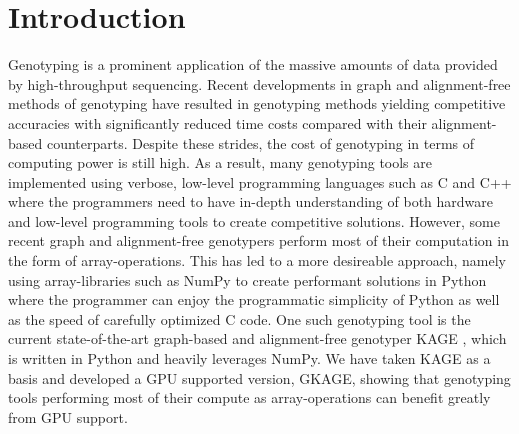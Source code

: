 \section*{Introduction}

Genotyping is a prominent application of the massive amounts of data provided by high-throughput sequencing. 
Recent developments in graph and alignment-free methods of genotyping have resulted in genotyping methods yielding competitive accuracies with significantly reduced time costs compared with their alignment-based counterparts.
Despite these strides, the cost of genotyping in terms of computing power is still high.
As a result, many genotyping tools are implemented using verbose, low-level programming languages such as C and C++ where the programmers need to have in-depth understanding of both hardware and low-level programming tools to create competitive solutions.
However, some recent graph and alignment-free genotypers perform most of their computation in the form of array-operations. 
This has led to a more desireable approach, namely using array-libraries such as NumPy \cite{numpy} to create performant solutions in Python where the programmer can enjoy the programmatic simplicity of Python as well as the speed of carefully optimized C code.
One such genotyping tool is the current state-of-the-art graph-based and alignment-free genotyper KAGE \cite{kage}, which is written in Python and heavily leverages NumPy.
We have taken KAGE as a basis and developed a GPU supported version, GKAGE, showing that genotyping tools performing most of their compute as array-operations can benefit greatly from GPU support.

